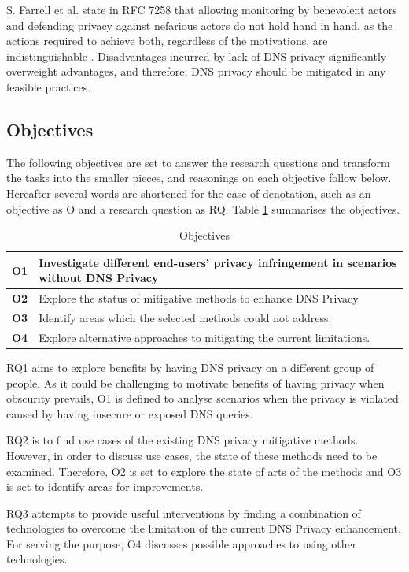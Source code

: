 \documentclass[a4paper,12pt]{article}
\begin{document}
S. Farrell et al. state in RFC 7258 that allowing monitoring by benevolent actors and defending privacy against nefarious actors do not hold hand in hand, as the actions required to achieve both, regardless of the motivations, are indistinguishable \cite{rfc7258}.
Disadvantages incurred by lack of DNS privacy significantly overweight advantages, and therefore, DNS privacy should be mitigated in any feasible practices.

\subsection{Objectives}
The following objectives are set to answer the research questions and transform the tasks into the smaller pieces, and reasonings on each objective follow below. Hereafter several words are shortened for the ease of denotation, such as an objective as O and a research question as RQ. Table \ref{objectives} summarises the objectives.
\begin{table}[h!]
    \begin{tabular} {|p{1.2cm}|p{12.8cm}|} \hline
        \textbf{O1} & Investigate different end-users' privacy infringement in scenarios without DNS Privacy\\ \hline
        \textbf{O2} & Explore the status of mitigative methods to enhance DNS Privacy \\ \hline
        \textbf{O3} & Identify areas which the selected methods could not address. \\ \hline
        \textbf{O4} & Explore alternative approaches to mitigating the current limitations.\\ \hline
    \end{tabular}
    \caption{Objectives}
    \label{objectives}
\end{table}

RQ1 aims to explore benefits by having DNS privacy on a different group of people.
As it could be challenging to motivate benefits of having privacy when obscurity prevails, O1 is defined to analyse scenarios when the privacy is violated caused by having insecure or exposed DNS queries.

RQ2 is to find use cases of the existing DNS privacy mitigative methods. However, in order to discuss use cases, the state of these methods need to be examined. Therefore, O2 is set to explore the state of arts of the methods and O3 is set to identify areas for improvements.

RQ3 attempts to provide useful interventions by finding a combination of technologies to overcome the limitation of the current DNS Privacy enhancement. For serving the purpose, O4 discusses possible approaches to using other technologies.
\end{document}
